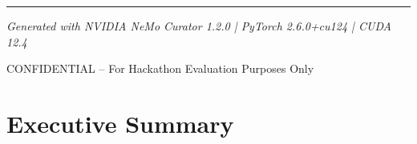\documentclass[11pt,a4paper]{article}
\begin{document}
\begin{titlepage}
    \vspace{2cm}
    
    {\color{nvidiaGreen}\rule{0.6\linewidth}{2pt}\par}
    \vspace{0.5cm}
    {\color{nvidiaBlue}\textit{Generated with NVIDIA NeMo Curator 1.2.0 | PyTorch 2.6.0+cu124 | CUDA 12.4}}
    
    \vfill
    
    {\color{nvidiaTextLight}\small CONFIDENTIAL -- For Hackathon Evaluation Purposes Only}
\end{titlepage}

\newpage
\tableofcontents
\newpage

\section{Executive Summary}
\label{sec:executive}
\end{document}
